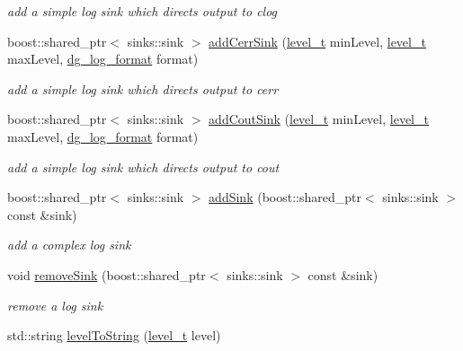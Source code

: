 \begin{DoxyCompactItemize}
\begin{DoxyCompactList}\small\item\em add a simple log sink which directs output to clog \end{DoxyCompactList}\item 
boost\+::shared\+\_\+ptr$<$ sinks\+::sink $>$ \hyperlink{group___utility_module_ga185ecc92fb211afe98782f6f8b1d7e97}{add\+Cerr\+Sink} (\hyperlink{namespacedg_1_1deepcore_ac108b40b3a6b8e3450281eb787e27d6b}{level\+\_\+t} min\+Level, \hyperlink{namespacedg_1_1deepcore_ac108b40b3a6b8e3450281eb787e27d6b}{level\+\_\+t} max\+Level, \hyperlink{namespacedg_1_1deepcore_1_1log_a6851fd8d8bef57cbcaba93f7bed8fdbd}{dg\+\_\+log\+\_\+format} format)
\begin{DoxyCompactList}\small\item\em add a simple log sink which directs output to cerr \end{DoxyCompactList}\item 
boost\+::shared\+\_\+ptr$<$ sinks\+::sink $>$ \hyperlink{group___utility_module_gab685eb3b065e30feda59f337bd016cb3}{add\+Cout\+Sink} (\hyperlink{namespacedg_1_1deepcore_ac108b40b3a6b8e3450281eb787e27d6b}{level\+\_\+t} min\+Level, \hyperlink{namespacedg_1_1deepcore_ac108b40b3a6b8e3450281eb787e27d6b}{level\+\_\+t} max\+Level, \hyperlink{namespacedg_1_1deepcore_1_1log_a6851fd8d8bef57cbcaba93f7bed8fdbd}{dg\+\_\+log\+\_\+format} format)
\begin{DoxyCompactList}\small\item\em add a simple log sink which directs output to cout \end{DoxyCompactList}\item 
boost\+::shared\+\_\+ptr$<$ sinks\+::sink $>$ \hyperlink{group___utility_module_ga44021d28fcb20375f28dc6b2dfcc8e06}{add\+Sink} (boost\+::shared\+\_\+ptr$<$ sinks\+::sink $>$ const \&sink)
\begin{DoxyCompactList}\small\item\em add a complex log sink \end{DoxyCompactList}\item 
void \hyperlink{group___utility_module_ga6b5b9a8a9fb82aab4e0a9e4eaa77a4b9}{remove\+Sink} (boost\+::shared\+\_\+ptr$<$ sinks\+::sink $>$ const \&sink)
\begin{DoxyCompactList}\small\item\em remove a log sink \end{DoxyCompactList}\item 
std\+::string \hyperlink{group___utility_module_ga16b3e354d4c2a3894e9fa0354103e7b3}{level\+To\+String} (\hyperlink{namespacedg_1_1deepcore_ac108b40b3a6b8e3450281eb787e27d6b}{level\+\_\+t} level)

\end{DoxyCompactItemize}
